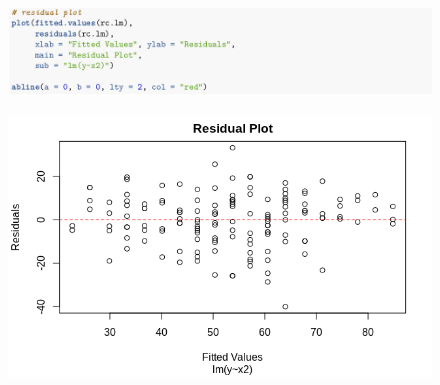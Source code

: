 \begin{figure}[H]
	\centering
	\includegraphics[width=\linewidth]{./images/s7fig7.png}
\end{figure}
\begin{figure}[H]
	\centering
	\includegraphics[width=12cm]{./images/s7fig3.png}
\end{figure}

